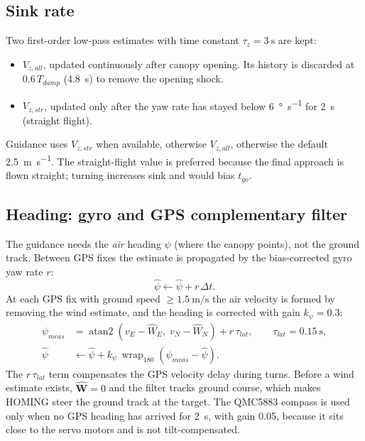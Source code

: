 \documentclass[11pt,a4paper]{article}
\newcommand{\vect}[1]{\mathbf{#1}}
\newcommand{\wrap}{\operatorname{wrap}}
\begin{document}
\subsection{Sink rate}
Two first-order low-pass estimates with time constant $\tau_z = \SI{3}{\second}$
are kept:
\begin{itemize}
  \item $V_{z,all}$, updated continuously after canopy opening. Its history
        is discarded at $0.6\,T_{damp}$ (\SI{4.8}{\second}) to remove the
        opening shock.
  \item $V_{z,str}$, updated only after the yaw rate has stayed below
        \SI{6}{\degree\per\second} for \SI{2}{\second} (straight flight).
\end{itemize}
Guidance uses $V_{z,str}$ when available, otherwise $V_{z,all}$, otherwise
the default \SI{2.5}{\meter\per\second}. The straight-flight value is
preferred because the final approach is flown straight; turning increases
sink and would bias $t_{go}$.

\subsection{Heading: gyro and GPS complementary filter}
The guidance needs the \emph{air} heading $\psi$ (where the canopy points),
not the ground track. Between GPS fixes the estimate is propagated by the
bias-corrected gyro yaw rate $r$:
\begin{equation}
  \hat\psi \leftarrow \hat\psi + r\,\Delta t .
\end{equation}
At each GPS fix with ground speed $\ge \SI{1.5}{\meter\per\second}$ the air
velocity is formed by removing the wind estimate, and the heading is
corrected with gain $k_\psi = 0.3$:
\begin{align}
  \psi_{meas} &= \operatorname{atan2}\!\left(v_E - \hat W_E,\; v_N - \hat W_N\right) + r\,\tau_{lat}, \qquad \tau_{lat} = \SI{0.15}{\second},\\
  \hat\psi &\leftarrow \hat\psi + k_\psi\, \wrap_{180}\!\left(\psi_{meas} - \hat\psi\right).
\end{align}
The $r\,\tau_{lat}$ term compensates the GPS velocity delay during turns.
Before a wind estimate exists, $\hat{\vect W}=0$ and the filter tracks ground
course, which makes HOMING steer the ground track at the target. The QMC5883
compass is used only when no GPS heading has arrived for \SI{2}{\second}, with
gain 0.05, because it sits close to the servo motors and is not
tilt-compensated.
\end{document}
